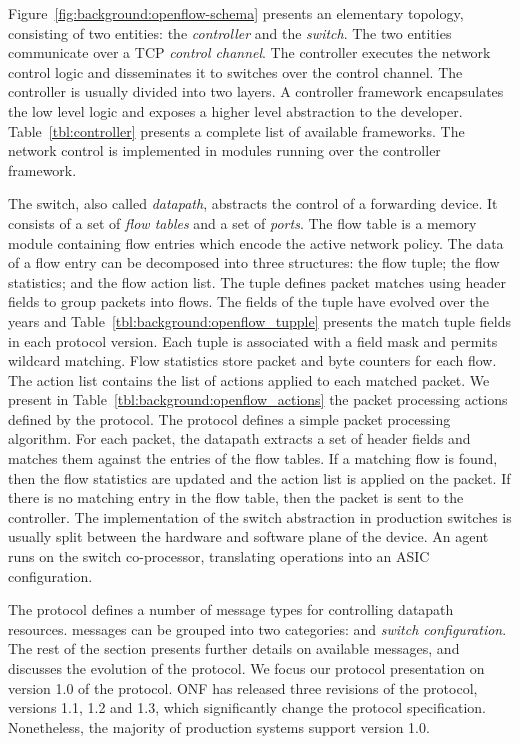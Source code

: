 Figure~\ref{fig:background:openflow-schema} presents an elementary \of topology,
consisting of two entities: the \textit{controller} and the \textit{switch}. The
two entities communicate over a TCP \textit{control channel}.  The \of controller
executes the network control logic and disseminates it to switches over
the control channel. The controller is usually divided into two layers. A controller
framework encapsulates the low level \of logic and exposes a higher
level abstraction to the developer.  Table~\ref{tbl:controller} presents a
complete list of available \of frameworks.  The network control is
implemented in modules running over the controller framework. 


The \of switch, also called \textit{datapath}, abstracts the control of a
forwarding device. It consists of a set of \textit{flow tables}
and a set of \textit{ports}. The flow table is a memory module containing flow
entries which encode the active network policy. The data of a flow entry can be
decomposed into three structures: the flow tuple; the flow statistics; and the flow
action list.  The tuple defines packet matches using header fields to group packets into
flows.  The fields of the tuple have evolved over the years and
Table~\ref{tbl:background:openflow_tupple} presents the match tuple fields
in each protocol version. Each tuple is associated with a field mask and permits
wildcard matching.  Flow statistics store packet and byte counters for each
flow. The action list contains the list of actions applied to each matched
packet.  We present in Table~\ref{tbl:background:openflow_actions} the packet
processing actions defined by the \of protocol.  The protocol defines a simple
packet processing algorithm.  For each packet, the datapath extracts a set
of header fields and matches them against the entries of the flow tables.  If a
matching flow is found, then the flow statistics are updated and the action list
is applied on the packet. If there is no matching entry in the flow table, then
the packet is sent to the controller. The implementation of the \of switch
abstraction in production switches is usually split between the hardware and
software plane of the device. An \of agent runs on the switch co-processor,
translating \of operations into an ASIC configuration.  

The protocol defines a number of message types for controlling datapath resources.
\of messages can be grouped into two categories:  and
\emph{switch configuration}. The rest of the section presents further details on
available \of messages, and discusses the evolution of the protocol.  We focus
our protocol presentation on version 1.0 of the protocol.  ONF has released
three revisions of the protocol, versions 1.1, 1.2 and 1.3, which
significantly change the protocol specification. Nonetheless, the majority of
production systems support version 1.0.

